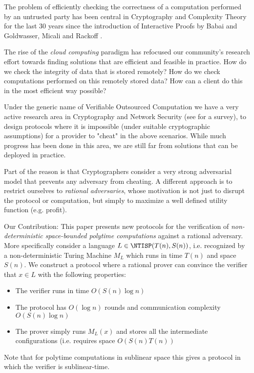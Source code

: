The problem of efficiently checking the correctness of a computation performed by an untrusted party has been central in Cryptography and Complexity Theory for the last 30 years since the introduction of Interactive Proofs by Babai and Goldwasser, Micali and Rackoff \cite{babai,gmr}. 

The rise of the {\em cloud computing} paradigm has refocused our community's research effort towards finding solutions that are efficient and feasible in practice. How do we check the integrity of data that is stored remotely? How do we check computations performed on this remotely stored data? How can a client do this in the most efficient way possible?

Under the generic name of {\sf Verifiable Outsourced Computation} we have a very active research area in Cryptography and Network Security (see \cite{wb15} for a survey), to design protocols where it is impossible (under suitable cryptographic assumptions) for a provider to "cheat" in the above scenarios. While much progress has been done in this area, we are still far from solutions that can be deployed in practice. 

Part of the reason is that Cryptographers consider a very strong adversarial model that prevents {\sf any} adversary from cheating. A different approach is to restrict ourselves to {\em rational adversaries}, whose motivation is not just to disrupt the protocol or computation, but simply to maximize a well defined utility function (e.g. profit).

\medskip
\noindent
{\sc Our Contribution:}
This paper presents new protocols for the verification of {\em non-deterministic space-bounded polytime computations} against a rational adversary. More specifically consider a language $L \in \NTISP(T(n), S(n))$, i.e. recognized by a non-deterministic Turing Machine $M_L$ which runs in time $T(n)$ and space $S(n)$. 
We construct a protocol where a rational prover can
convince the verifier that $x \in L$ with the following properties: 
\begin{itemize}
\item The verifier runs in time $O(S(n) \log n)$
\item The protocol has $O(\log n)$ rounds and communication complexity $O(S(n) \log n)$
\item The prover simply runs $M_L(x)$ and stores all the intermediate configurations (i.e. requires space $O(S(n) T(n))$
\end{itemize}
Note that for polytime computations in sublinear space this gives a protocol in which the verifier is sublinear-time. 

